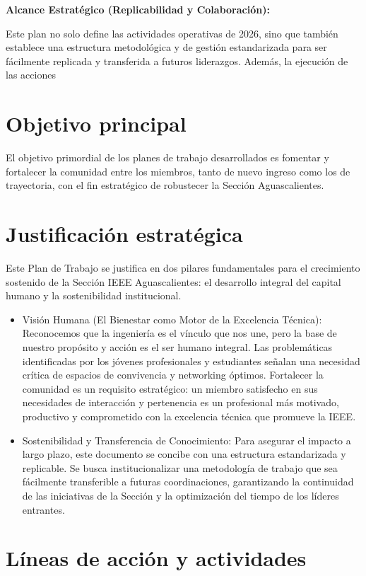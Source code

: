\documentclass[11pt,a4paper]{article}
\begin{document}
\textbf{Alcance Estratégico (Replicabilidad y Colaboración):}

Este plan no solo define las actividades operativas de 2026, sino que también establece una estructura metodológica y de gestión estandarizada para ser fácilmente replicada y transferida a futuros liderazgos. Además, la ejecución de las acciones 


\section{Objetivo principal}
El objetivo primordial de los planes de trabajo desarrollados es fomentar y fortalecer la comunidad entre los miembros, tanto de nuevo ingreso como los de trayectoria, con el fin estratégico de robustecer la Sección Aguascalientes.



\section{Justificación estratégica}
Este Plan de Trabajo se justifica en dos pilares fundamentales para el crecimiento sostenido de la Sección IEEE Aguascalientes: el desarrollo integral del capital humano y la sostenibilidad institucional.
\begin{itemize}
    \item Visión Humana (El Bienestar como Motor de la Excelencia Técnica): Reconocemos que la ingeniería es el vínculo que nos une, pero la base de nuestro propósito y acción es el ser humano integral. Las problemáticas identificadas por los jóvenes profesionales y estudiantes señalan una necesidad crítica de espacios de convivencia y networking óptimos. Fortalecer la comunidad es un requisito estratégico: un miembro satisfecho en sus necesidades de interacción y pertenencia es un profesional más motivado, productivo y comprometido con la excelencia técnica que promueve la IEEE.
\item Sostenibilidad y Transferencia de Conocimiento: Para asegurar el impacto a largo plazo, este documento se concibe con una estructura estandarizada y replicable. Se busca institucionalizar una metodología de trabajo que sea fácilmente transferible a futuras coordinaciones, garantizando la continuidad de las iniciativas de la Sección y la optimización del tiempo de los líderes entrantes.
\end{itemize}

\section{Líneas de acción y actividades}
\end{document}
